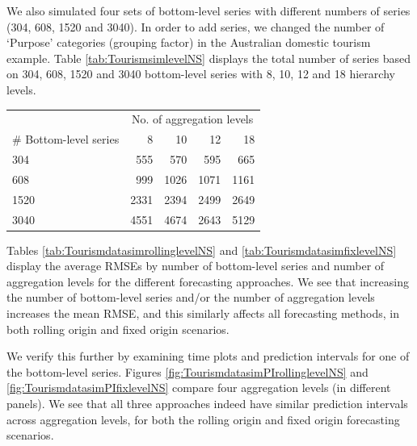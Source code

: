 \documentclass[11pt,a4paper,]{article}
\let\origtable\table
\let\endorigtable\endtable
\renewenvironment{table}[1][2] {
    \expandafter\origtable\expandafter[!htbp]
} {
    \endorigtable
}
\begin{document}
We also simulated four sets of bottom-level series with different numbers of series (304, 608, 1520 and 3040). In order to add series, we changed the number of `Purpose' categories (grouping factor) in the Australian domestic tourism example. Table \ref{tab:TourismsimlevelNS} displays the total number of series based on 304, 608, 1520 and 3040 bottom-level series with 8, 10, 12 and 18 hierarchy levels.

\begin{table}

\caption{\label{tab:TourismsimlevelNS}Total number of series in hierarchy structure based on the number of bottom-level series and aggregation levels.}
\centering
\begin{tabular}[t]{lrrrr}
\toprule
\multicolumn{1}{c}{} & \multicolumn{4}{c}{No. of aggregation levels} \\
\cmidrule(l{3pt}r{3pt}){2-5}
\# Bottom-level series & 8 & 10 & 12 & 18\\
\midrule
304 & 555 & 570 & 595 & 665\\
608 & 999 & 1026 & 1071 & 1161\\
1520 & 2331 & 2394 & 2499 & 2649\\
3040 & 4551 & 4674 & 2643 & 5129\\
\bottomrule
\end{tabular}
\end{table}

Tables \ref{tab:TourismdatasimrollinglevelNS} and \ref{tab:TourismdatasimfixlevelNS} display the average RMSEs by number of bottom-level series and number of aggregation levels for the different forecasting approaches. We see that increasing the number of bottom-level series and/or the number of aggregation levels increases the mean RMSE, and this similarly affects all forecasting methods, in both rolling origin and fixed origin scenarios.

We verify this further by examining time plots and prediction intervals for one of the bottom-level series. Figures \ref{fig:TourismdatasimPIrollinglevelNS} and \ref{fig:TourismdatasimPIfixlevelNS} compare four aggregation levels (in different panels). We see that all three approaches indeed have similar prediction intervals across aggregation levels, for both the rolling origin and fixed origin forecasting scenarios.
\end{document}
